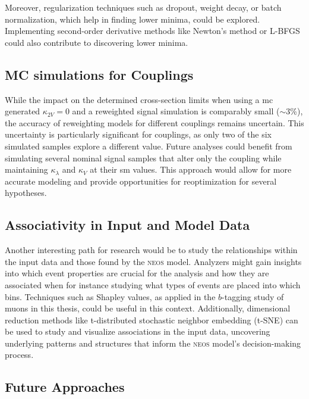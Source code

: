 Moreover, regularization techniques such as dropout, weight decay, or batch normalization, which help in finding lower minima, could be explored. Implementing second-order derivative methods like Newton's method or L-BFGS could also contribute to discovering lower minima.




\subsection{MC simulations for \ktwov Couplings}
While the impact on the determined cross-section limits when using a \ac{mc} generated $\kappa_{2V} = 0$ and a reweighted signal simulation is comparably small ($\sim$3\%), the accuracy of reweighting models for different \ktwov couplings remains uncertain. This uncertainty is particularly significant for \ktwov couplings, as only two of the six simulated samples explore a different \ktwov value. Future analyses could benefit from simulating several nominal signal samples that alter only the \ktwov coupling while maintaining $\kappa_\lambda$ and $\kappa_V$ at their \ac{sm} values. This approach would allow for more accurate modeling and provide opportunities for reoptimization for several \ktwov hypotheses.


\subsection{Associativity in Input and Model Data}
Another interesting path for research would be to study the relationships within the input data and those found by the \textsc{neos} model. Analyzers might gain insights into which event properties are crucial for the analysis and how they are associated when for instance studying what types of events are placed into which bins. Techniques such as Shapley values, as applied in the $b$-tagging study of muons in this thesis, could be useful in this context. Additionally, dimensional reduction methods like t-distributed stochastic neighbor embedding (t-SNE) can be used to study and visualize associations in the input data, uncovering underlying patterns and structures that inform the \textsc{neos} model's decision-making process.

\subsection{Future Approaches}

